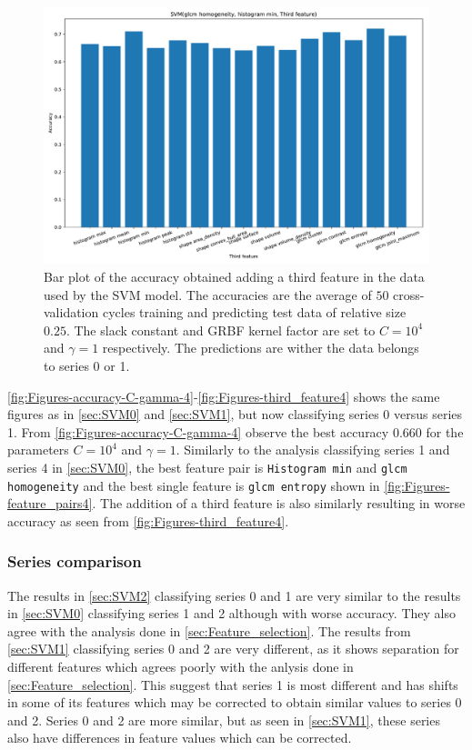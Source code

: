 \begin{figure}[H]
\centering
\includegraphics[width=1\textwidth]{Figures/third_feature4}
\caption{Bar plot of the accuracy obtained adding a third feature in the data used 
by the SVM model. The accuracies are the average 
of $50$ cross-validation cycles training and predicting test data of relative size $0.25$.
The slack constant and GRBF kernel factor are set to $C=10^4$ and $\gamma=1 $ respectively.
 The predictions are wither the data belongs to series 0 or 1.}
\label{fig:Figures-third_feature4}
\end{figure}

\autoref{fig:Figures-accuracy-C-gamma-4}-\autoref{fig:Figures-third_feature4} shows the same figures as in \autoref{sec:SVM0} and \autoref{sec:SVM1}, 
but now classifying series 0 versus series 1. From \autoref{fig:Figures-accuracy-C-gamma-4} observe the best accuracy $0.660$ for the 
parameters $C = 10^4$ and $\gamma =1$. Similarly to the analysis classifying series 1 and series 4 in \autoref{sec:SVM0}, the best feature pair is \verb|Histogram min|
and \verb|glcm homogeneity| and the best single feature is \verb|glcm entropy| shown in \autoref{fig:Figures-feature_pairs4}. The addition of a third feature is also similarly 
resulting in worse accuracy as seen from \autoref{fig:Figures-third_feature4}. 

\subsubsection{Series comparison}
\label{sec:comparison}

The results in \autoref{sec:SVM2} classifying series 0 and 1 are very similar 
to the results in \autoref{sec:SVM0} classifying series 1 and 2 although with worse accuracy. They also 
agree with the analysis done in \autoref{sec:Feature_selection}.
The results from \autoref{sec:SVM1} classifying series 0 and 2 are very different, as it shows 
separation for different features which agrees poorly with the anlysis done in \autoref{sec:Feature_selection}. This suggest 
that series 1 is most different and has shifts in some of its features which may be corrected to obtain similar values 
to series 0 and 2. Series 0 and 2 are more similar, but as seen in \autoref{sec:SVM1}, these series 
also have differences in feature values which can be corrected. 


